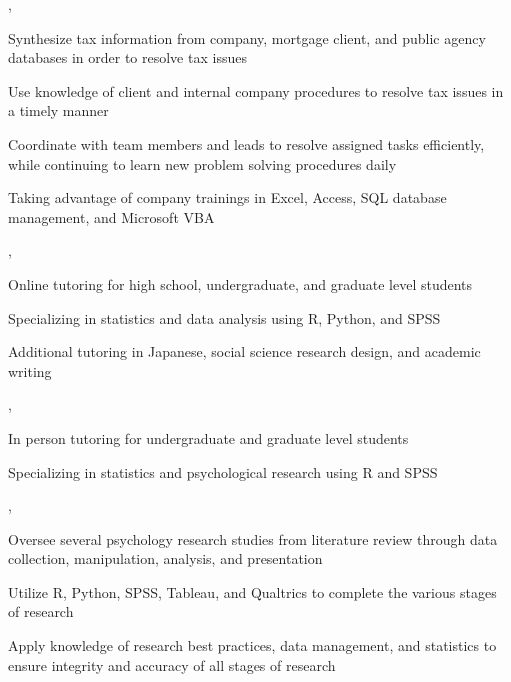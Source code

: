 \documentclass[letterpaper]{deedy-resume_sm}
\begin{document}
, 
\begin{tightitemize}
\item Synthesize tax information from company, mortgage client, and public agency databases in order to resolve tax issues
\item Use knowledge of client and internal company procedures to resolve tax issues in a timely manner
\item Coordinate with team members and leads to resolve assigned tasks efficiently, while continuing to learn new problem solving procedures daily
\item Taking advantage of company trainings in Excel, Access, SQL database management, and Microsoft VBA
\end{tightitemize}
\sectionspace

, 
\begin{tightitemize}
\item Online tutoring for high school, undergraduate, and graduate level students
\item Specializing in statistics and data analysis using R, Python, and SPSS
\item Additional tutoring in Japanese, social science research design, and academic writing
\end{tightitemize}
\sectionspace

, 
\begin{tightitemize}
\item In person tutoring for undergraduate and graduate level students
\item Specializing in statistics and psychological research using R and SPSS
\end{tightitemize}
\sectionspace

, 
\begin{tightitemize}
\item Oversee several psychology research studies from literature review through data collection, manipulation, analysis, and presentation
\item Utilize R, Python, SPSS, Tableau, and Qualtrics to complete the various stages of research
\item Apply knowledge of research best practices, data management, and statistics to ensure integrity and accuracy of all stages of research
\end{tightitemize}
\sectionspace
\end{document}
